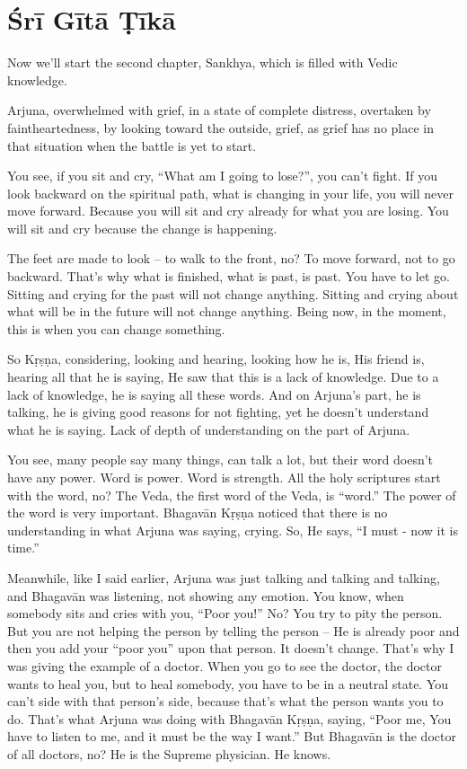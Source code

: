 \section{Śrī Gītā Ṭīkā}

Now we’ll start the second chapter, Sankhya, which is filled with Vedic knowledge.

Arjuna, overwhelmed with grief, in a state of complete distress, overtaken by faintheartedness, by looking toward the outside, grief, as grief has no place in that situation when the battle is yet to start.

You see, if you sit and cry, “What am I going to lose?”, you can’t fight. If you look backward on the spiritual path, what is changing in your life, you will never move forward. Because you will sit and cry already for what you are losing. You will sit and cry because the change is happening.

The feet are made to look – to walk to the front, no? To move forward, not to go backward. That’s why what is finished, what is past, is past. You have to let go. Sitting and crying for the past will not change anything. Sitting and crying about what will be in the future will not change anything. Being now, in the moment, this is when you can change something.

So Kṛṣṇa, considering, looking and hearing, looking how he is, His friend is, hearing all that he is saying, He saw that this is a lack of knowledge. Due to a lack of knowledge, he is saying all these words. And on Arjuna’s part, he is talking, he is giving good reasons for not fighting, yet he doesn’t understand what he is saying. Lack of depth of understanding on the part of Arjuna.

You see, many people say many things, can talk a lot, but their word doesn’t have any power. Word is power. Word is strength. All the holy scriptures start with the word, no? The Veda, the first word of the Veda, is “word.” The power of the word is very important. Bhagavān Kṛṣṇa noticed that there is no understanding in what Arjuna was saying, crying. So, He says, “I must - now it is time.”

Meanwhile, like I said earlier, Arjuna was just talking and talking and talking, and Bhagavān was listening, not showing any emotion. You know, when somebody sits and cries with you, “Poor you!” No? You try to pity the person. But you are not helping the person by telling the person – He is already poor and then you add your “poor you” upon that person. It doesn’t change. That’s why I was giving the example of a doctor. When you go to see the doctor, the doctor wants to heal you, but to heal somebody, you have to be in a neutral state. You can’t side with that person’s side, because that’s what the person wants you to do. That’s what Arjuna was doing with Bhagavān Kṛṣṇa, saying, “Poor me, You have to listen to me, and it must be the way I want.” But Bhagavān is the doctor of all doctors, no? He is the Supreme physician. He knows.

